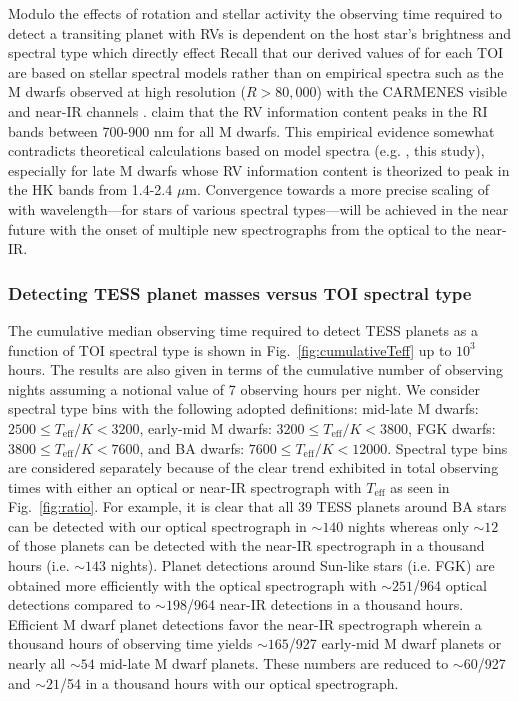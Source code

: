 Modulo the effects of rotation and stellar activity the observing time required to detect a transiting
planet with RVs is dependent on the host star's brightness and spectral type which directly effect  
Recall that our derived values of \sigRV{} for each TOI are based on stellar spectral models rather than on
empirical spectra such as the M dwarfs observed at high resolution ($R > 80,000$) with the CARMENES visible and
near-IR channels \citep{reiners18}. \cite{reiners18}
claim that the RV information content peaks in the RI bands
between 700-900 nm for all M dwarfs. This empirical evidence somewhat contradicts theoretical calculations
based on model spectra (e.g. \citealt{figueira16}, this study), especially for late M dwarfs whose RV
information content is theorized to peak in the HK bands from 1.4-2.4 $\mu$m. Convergence towards a more
precise scaling of \sigRV{} with wavelength---for stars of various spectral types---will be achieved in the
near future with the onset of multiple new spectrographs from the optical to the near-IR.


\subsubsection{Detecting TESS planet masses versus TOI spectral type}
The cumulative median observing time required to detect TESS planets as a function of TOI spectral type
is shown in Fig.~\ref{fig:cumulativeTeff} up to $10^3$ hours. The results are also given in terms of
the cumulative number of observing nights assuming a notional value of 7 observing hours per night. 
We consider spectral type bins with the following adopted definitions:
mid-late M dwarfs: $2500 \leq T_{\text{eff}}/K < 3200$,
early-mid M dwarfs: $3200 \leq T_{\text{eff}}/K < 3800$,
FGK dwarfs: $3800 \leq T_{\text{eff}}/K < 7600$, and
BA dwarfs: $7600 \leq T_{\text{eff}}/K < 12000$. Spectral type bins are considered separately
because of the clear trend exhibited in total observing times
with either an optical or near-IR spectrograph with $T_{\text{eff}}$ as seen in Fig.~\ref{fig:ratio}.
For example, it is clear that all 39 TESS planets around BA stars can be detected with our 
optical spectrograph in $\sim 140$ nights whereas only $\sim 12$ of those
planets can be detected with the near-IR spectrograph in a thousand hours (i.e. $\sim 143$ nights).
Planet detections around Sun-like
stars (i.e. FGK) are obtained more efficiently with the optical spectrograph with $\sim 251$/964 optical
detections compared to $\sim 198$/964 near-IR detections in a thousand hours.
Efficient M dwarf planet detections favor the near-IR
spectrograph wherein a thousand hours of observing time yields $\sim 165$/927 early-mid M dwarf planets
or nearly all $\sim 54$ mid-late M dwarf planets.
These numbers are reduced to $\sim 60$/927 and $\sim 21$/54 in a thousand hours with our 
optical spectrograph.


